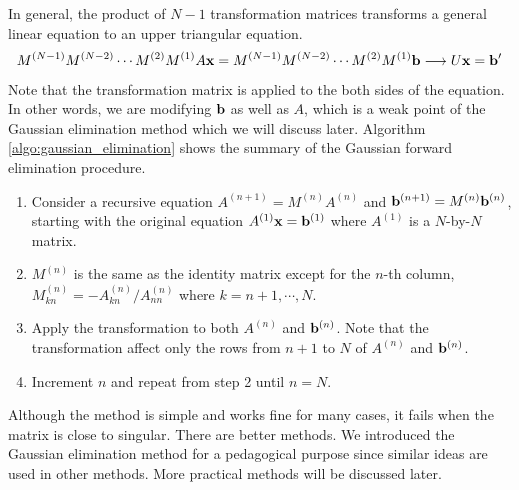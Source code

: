 In general,  the product of $N-1$ transformation matrices transforms a general linear equation to an upper triangular equation.
\begin{equation}\label{eq:gaussian-elimination-matrix}
M^{(N-1)} M^{(N-2)} \cdots M^{(2)} M^{(1)} A \vb{x}=M^{(N-1)} M^{(N-2)} \cdots M^{(2)} M^{(1)}\vb{b} \longrightarrow U\vb{x}=\vb{b}' 
\end{equation}
Note that the transformation matrix is applied to the both sides of the equation.  In other words, we are modifying $\vb{b}$ as well as $A$, which is a weak point of the Gaussian elimination method which we will discuss later.
Algorithm \ref{algo:gaussian_elimination} shows the summary of the Gaussian forward elimination procedure.

\begin{myalgobox}
   \label{algo:gaussian_elimination}
   
   \medskip
   \begin{enumerate}
      \item  Consider a recursive equation $A^{(n+1)} = M^{(n)} A^{(n)}$ and $\vb{b}^{(n+1)} = M^{(n)} \vb{b}^{(n)}$, starting with the original equation $A^{(1)} \vb{x} = \vb{b}^{(1)}$ where $A^{(1)}$ is a $N$-by-$N$ matrix.

      \item  $M^{(n)}$ is the same as the identity matrix except for the $n$-th column,\\  $M^{(n)}_{kn}=-A^{(n)}_{kn}/A^{(n)}_{nn}$ where $k=n+1, \cdots, N$.
      
      \item  Apply the transformation to both $A^{(n)}$ and $\vb{b}^{(n)}$. Note that the transformation affect only the rows from $n+1$ to $N$ of $A^{(n)}$ and $\vb{b}^{(n)}$.
      
      \item  Increment $n$ and repeat from step 2 until $n=N$.
   \end{enumerate}
\end{myalgobox}

Although the method is simple and works fine for many cases, it fails when the matrix is close to singular. There are better methods. We introduced the Gaussian elimination method for a pedagogical purpose since similar ideas are used in other methods.  More practical methods will be discussed later.

